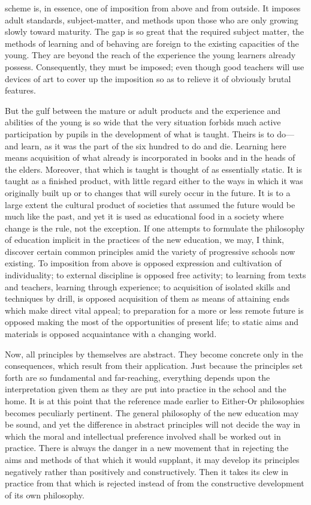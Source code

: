 scheme is, in essence, one of imposition from above and from outside. It imposes adult 
standards, subject-matter, and methods upon those who are only growing slowly toward 
maturity. The gap is so great that the required subject matter, the methods of learning and 
of behaving are foreign to the existing capacities of the young. They are beyond the reach 
of the experience the young learners already possess. Consequently, they must be 
imposed; even though good teachers will use devices of art to cover up the imposition so 
as to relieve it of obviously brutal features. 

But the gulf between the mature or adult products and the experience and abilities of 
the young is so wide that the very situation forbids much active participation by pupils in 
the development of what is taught. Theirs is to do— and learn, as it was the part of the six 
hundred to do and die. Learning here means acquisition of what already is incorporated in 
books and in the heads of the elders. Moreover, that which is taught is thought of as 
essentially static. It is taught as a finished product, with little regard either to the ways in 
which it was originally built up or to changes that will surely occur in the future. It is to a 
large extent the cultural product of societies that assumed the future would be much like 
the past, and yet it is used as educational food in a society where change is the rule, not 
the exception. If one attempts to formulate the philosophy of education implicit in the 
practices of the new education, we may, I think, discover certain common principles amid 
the variety of progressive schools now existing. To imposition from above is opposed 
expression and cultivation of individuality; to external discipline is opposed free activity; 
to learning from texts and teachers, learning through experience; to acquisition of isolated 
skills and techniques by drill, is opposed acquisition of them as means of attaining ends 
which make direct vital appeal; to preparation for a more or less remote future is opposed 
making the most of the opportunities of present life; to static aims and materials is 
opposed acquaintance with a changing world. 

Now, all principles by themselves are abstract. They become concrete only in the 
consequences, which result from their application. Just because the principles set forth 
are so fundamental and far-reaching, everything depends upon the interpretation given 
them as they are put into practice in the school and the home. It is at this point that the 
reference made earlier to Either-Or philosophies becomes peculiarly pertinent. The 
general philosophy of the new education may be sound, and yet the difference in abstract 
principles will not decide the way in which the moral and intellectual preference involved 
shall be worked out in practice. There is always the danger in a new movement that in 
rejecting the aims and methods of that which it would supplant, it may develop its 
principles negatively rather than positively and constructively. Then it takes its clew in 
practice from that which is rejected instead of from the constructive development of its 
own philosophy. 

